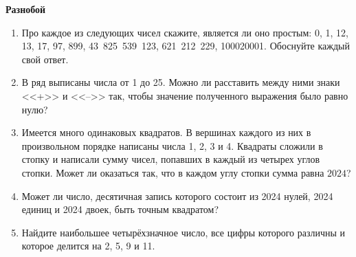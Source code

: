 \documentclass{article}
\begin{document}
\large
	
\begin{center}
	\textbf{Разнобой}
\end{center}


\begin{enumerate}[label*=\protect\fbox{\arabic{enumi}}]

\item Про каждое из следующих чисел скажите, является ли оно простым: 0, 1, 12, 13, 17, 97, 899, 43 825 539 123, 621 212 229, 100020001. Обоснуйте каждый свой ответ.

\item В ряд выписаны числа от 1 до 25. Можно ли расставить между
ними знаки <<+>> и <<-->> так, чтобы значение полученного выражения
было равно нулю?

\item Имеется много одинаковых квадратов. В вершинах каждого из них в произвольном порядке написаны числа 1, 2, 3 и 4. Квадраты сложили в стопку и написали сумму чисел, попавших в каждый из четырех углов стопки. Может ли оказаться так, что в каждом углу стопки сумма равна $2024$?


\item Может ли число, десятичная запись которого состоит из 2024 нулей, 2024 единиц и 2024 двоек, быть точным квадратом?


\item Найдите наибольшее четырёхзначное число, все цифры которого различны и которое делится на 2, 5, 9 и 11.

\end{enumerate}
\end{document}
